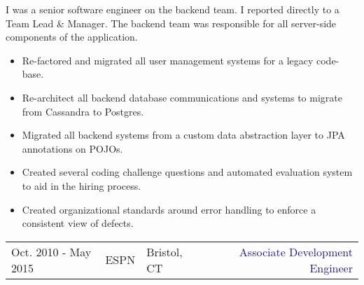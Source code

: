 \documentclass{article}
\begin{document}
\vspace{3pt} I was a senior software engineer on the backend team. I reported directly to a Team Lead \& Manager. The backend team was responsible for all server-side components of the application. 
\vspace{3pt}\begin{multicols}{2}
  \begin{small}
    \begin{itemize}[leftmargin=*,label=\tiny{$\bullet$}]
    \item\begin{minipage}[t]{\linewidth}{Re-factored and migrated all user management systems for a legacy code-base.}\end{minipage}
    \item\begin{minipage}[t]{\linewidth}{Re-architect all backend database communications and systems to migrate from Cassandra to Postgres.}\end{minipage}
    \item\begin{minipage}[t]{\linewidth}{Migrated all backend systems from a custom data abstraction layer to JPA annotations on POJOs.}\end{minipage}
    \item\begin{minipage}[t]{\linewidth}{Created several coding challenge questions and automated evaluation system to aid in the hiring process.}\end{minipage}
    \item\begin{minipage}[t]{\linewidth}{Created organizational standards around error handling to enforce a consistent view of defects.}\end{minipage}
    \end{itemize}
  \end{small} 
\end{multicols}

\vspace{15pt}\begin{tabularx}{\textwidth}{@{}lllXr}
  Oct. 2010 - May 2015&\textcolor{Mahogany}{ESPN}&\textcolor{Black!80}{Bristol, CT}&&\textcolor{MidnightBlue}{Associate Development Engineer}
\end{tabularx}
\end{document}
